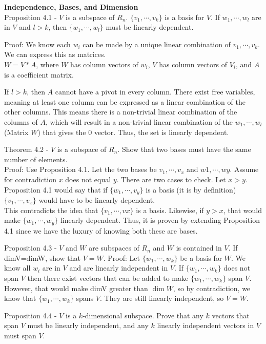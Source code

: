 \documentclass[12pt]{article}
\begin{document}
\textbf{Independence, Bases, and Dimension}\\

Proposition 4.1 - $V$ is a subspace of $R_n$. $\{v_1,\cdots,v_k \}$ is a basis for $V$. If $w_1, \cdots, w_l$ are in $V$ and $l>k$, then $\{w_1,\cdots,w_l\}$ must be linearly dependent.


Proof: We know each $w_i$ can be made by a unique linear combination of $v_1,\cdots, v_k$.\\
We can express this as matrices.\\
$W=V*A$, where $W$ has column vectors of $w_i$, $V$ has column vectors of $V_i$, and $A$ is a coefficient
matrix.

If $l>k$, then $A$ cannot have a pivot in every column. There exist free variables, meaning at least
one column can be expressed as a linear combination of the other columns. This means there is
a non-trivial linear combination of the columns of $A$, which will result in a non-trivial linear
combination of the $w_1,\cdots,w_l$ (Matrix $W$) that gives the 0 vector. Thus, the set is linearly
dependent.


Theorem 4.2 - $V$ is a subspace of $R_n$. Show that two bases must have the same number of
elements.\\
Proof: Use Proposition 4.1. Let the two bases be $v_1,\cdots,v_x$ and $w1,\cdots,wy$. Assume for
contradiction $x$ does not equal $y$. There are two cases to check. Let $x>y$. Proposition 4.1 would
say that if $\{w_1,\cdots,v_y\}$ is a basis (it is by definition) $\{v_1,\cdots,v_x\}$ would have to be linearly dependent.\\
This contradicts the idea that $\{v_1,\cdots,vx\}$ is a basis. Likewise, if $y>x$, that would make $\{w_1,\cdots,w_y\}$
linearly dependent. Thus, it is proven by extending Proposition 4.1 since we have the luxury of
knowing both these are bases.

Proposition 4.3 - $V$ and $W$ are subspaces of $R_n$ and $W$ is contained in $V$. If dimV=dimW, show
that $V=W$.
Proof: Let $\{w_1,\cdots,w_k\}$ be a basis for $W$. We know all $w_i$ are in $V$ and are linearly independent in
$V$. If $\{w_1,\cdots,w_k\}$ does not span $V$ then there exist vectors that can be added to make $\{w_1,\cdots,w_k\}$
span $V$. However, that would make dimV greater than $\dim W$, so by contradiction, we know that
$\{w_1,\cdots,w_k\}$ spans $V$. They are still linearly independent, so $V=W$.

Proposition 4.4 - $V$ is a $k$-dimensional subspace. Prove that any $k$ vectors that span $V$ must be
linearly independent, and any $k$ linearly independent vectors in $V$ must span $V$.
\end{document}
